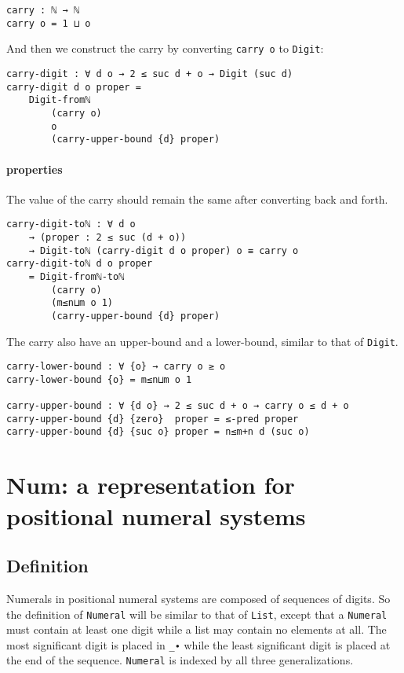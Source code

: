 \documentclass[../thesis.tex]{subfiles}
\begin{document}
\begin{lstlisting}
carry : ℕ → ℕ
carry o = 1 ⊔ o
\end{lstlisting}

And then we construct the carry by converting {\lstinline|carry o|} to {\lstinline|Digit|}:

\begin{lstlisting}
carry-digit : ∀ d o → 2 ≤ suc d + o → Digit (suc d)
carry-digit d o proper =
    Digit-fromℕ
        (carry o)
        o
        (carry-upper-bound {d} proper)
\end{lstlisting}

\paragraph{properties}

The value of the carry should remain the same after converting back and forth.

\begin{lstlisting}
carry-digit-toℕ : ∀ d o
    → (proper : 2 ≤ suc (d + o))
    → Digit-toℕ (carry-digit d o proper) o ≡ carry o
carry-digit-toℕ d o proper
    = Digit-fromℕ-toℕ
        (carry o)
        (m≤n⊔m o 1)
        (carry-upper-bound {d} proper)
\end{lstlisting}

The carry also have an upper-bound and a lower-bound, similar to that of {\lstinline|Digit|}.

\begin{lstlisting}
carry-lower-bound : ∀ {o} → carry o ≥ o
carry-lower-bound {o} = m≤n⊔m o 1

carry-upper-bound : ∀ {d o} → 2 ≤ suc d + o → carry o ≤ d + o
carry-upper-bound {d} {zero}  proper = ≤-pred proper
carry-upper-bound {d} {suc o} proper = n≤m+n d (suc o)
\end{lstlisting}

\section{Num: a representation for positional numeral systems}\label{representation}

\subsection{Definition}

Numerals in positional numeral systems are composed of sequences of digits.
So the definition of {\lstinline|Numeral|} will be similar to that of {\lstinline|List|},
except that a {\lstinline|Numeral|} must contain at least one digit while a list
may contain no elements at all. The most significant digit is placed in {\lstinline|_∙|}
while the least significant digit is placed at the end of the sequence.
{\lstinline|Numeral|} is indexed by all three generalizations.
\end{document}

